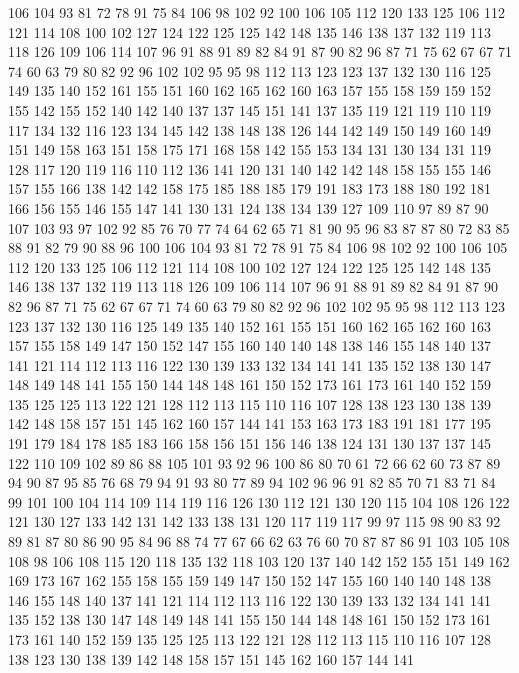 106 104 93 81 72 78 91 75 84 106 98 102 92 100 106 105 112 120 133 125
106 112 121 114 108 100 102 127 124 122 125 125 142 148 135 146 138 137 132 119
113 118 126 109 106 114 107 96 91 88 91 89 82 84 91 87 90 82 96 87
71 75 62 67 67 71 74 60 63 79 80 82 92 96 102 102 95 95 98 112
113 123 123 137 132 130 116 125 149 135 140 152 161 155 151 160 162 165 162 160
163 157 155 158 159 159 152 155 142 155 152 140 142 140 137 137 145 151 141 137
135 119 121 119 110 119 117 134 132 116 123 134 145 142 138 148 138 126 144 142
149 150 149 160 149 151 149 158 163 151 158 175 171 168 158 142 155 153 134 131
130 134 131 119 128 117 120 119 116 110 112 136 141 120 131 140 142 142 148 158
155 155 146 157 155 166 138 142 142 158 175 185 188 185 179 191 183 173 188 180
192 181 166 156 155 146 155 147 141 130 131 124 138 134 139 127 109 110 97 89
87 90 107 103 93 97 102 92 85 76 70 77 74 64 62 65 71 81 90 95
96 83 87 87 80 72 83 85 88 91 82 79 90 88 96 100 106 104 93 81
72 78 91 75 84 106 98 102 92 100 106 105 112 120 133 125 106 112 121 114
108 100 102 127 124 122 125 125 142 148 135 146 138 137 132 119 113 118 126 109
106 114 107 96 91 88 91 89 82 84 91 87 90 82 96 87 71 75 62 67
67 71 74 60 63 79 80 82 92 96 102 102 95 95 98 112 113 123 123 137
132 130 116 125 149 135 140 152 161 155 151 160 162 165 162 160 163 157 155 158
149 147 150 152 147 155 160 140 140 148 138 146 155 148 140 137 141 121 114 112
113 116 122 130 139 133 132 134 141 141 135 152 138 130 147 148 149 148 141 155
150 144 148 148 161 150 152 173 161 173 161 140 152 159 135 125 125 113 122 121
128 112 113 115 110 116 107 128 138 123 130 138 139 142 148 158 157 151 145 162
160 157 144 141 153 163 173 183 191 181 177 195 191 179 184 178 185 183 166 158
156 151 156 146 138 124 131 130 137 137 145 122 110 109 102 89 86 88 105 101
93 92 96 100 86 80 70 61 72 66 62 60 73 87 89 94 90 87 95 85
76 68 79 94 91 93 80 77 89 94 102 96 96 91 82 85 70 71 83 71
84 99 101 100 104 114 109 114 119 116 126 130 112 121 130 120 115 104 108 126
122 121 130 127 133 142 131 142 133 138 131 120 117 119 117 99 97 115 98 90
83 92 89 81 87 80 86 90 95 84 96 88 74 77 67 66 62 63 76 60
70 87 87 86 91 103 105 108 108 98 106 108 115 120 118 135 132 118 103 120
137 140 142 152 155 151 149 162 169 173 167 162 155 158 155 159 149 147 150 152
147 155 160 140 140 148 138 146 155 148 140 137 141 121 114 112 113 116 122 130
139 133 132 134 141 141 135 152 138 130 147 148 149 148 141 155 150 144 148 148
161 150 152 173 161 173 161 140 152 159 135 125 125 113 122 121 128 112 113 115
110 116 107 128 138 123 130 138 139 142 148 158 157 151 145 162 160 157 144 141
